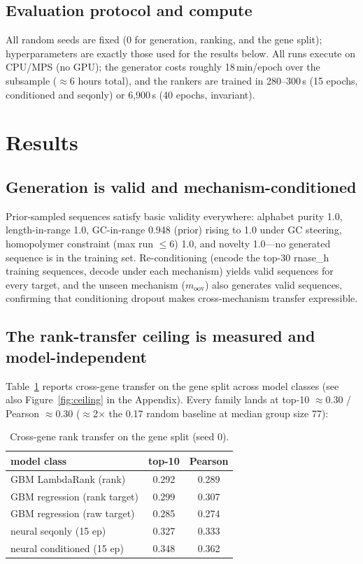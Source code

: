 \documentclass{article} %
\begin{document}
\subsection{Evaluation protocol and compute}

All random seeds are fixed (0 for generation, ranking, and the gene split); hyperparameters are exactly those used for the results below. All runs execute on CPU/MPS (no GPU); the generator costs roughly 18\,min/epoch over the subsample ($\approx$6 hours total), and the rankers are trained in 280--300\,s (15 epochs, conditioned and seqonly) or 6{,}900\,s (40 epochs, invariant).

\section{Results}

\subsection{Generation is valid and mechanism-conditioned}

Prior-sampled sequences satisfy basic validity everywhere: alphabet purity 1.0, length-in-range 1.0, GC-in-range 0.948 (prior) rising to 1.0 under GC steering, homopolymer constraint (max run $\le 6$) 1.0, and novelty 1.0---no generated sequence is in the training set. Re-conditioning (encode the top-30 rnase\_h training sequences, decode under each mechanism) yields valid sequences for every target, and the unseen mechanism ($m_{\mathrm{oov}}$) also generates valid sequences, confirming that conditioning dropout makes cross-mechanism transfer expressible.

\subsection{The rank-transfer ceiling is measured and model-independent}

Table~\ref{tab:ceiling} reports cross-gene transfer on the gene split across model classes (see also Figure~\ref{fig:ceiling} in the Appendix). Every family lands at top-10 $\approx 0.30$ / Pearson $\approx 0.30$ ($\approx$2$\times$ the 0.17 random baseline at median group size 77):

\begin{table}[t]
\centering
\begin{tabular}{lcc}
\toprule
model class & top-10 & Pearson \\
\midrule
GBM LambdaRank \citep{ke2017} (rank) & 0.292 & 0.289 \\
GBM regression (rank target) & 0.299 & 0.307 \\
GBM regression (raw target) & 0.285 & 0.274 \\
neural seqonly (15 ep) & 0.327 & 0.333 \\
neural conditioned (15 ep) & 0.348 & 0.362 \\
\bottomrule
\end{tabular}
\caption{Cross-gene rank transfer on the gene split (seed 0).}
\label{tab:ceiling}
\end{table}
\end{document}
